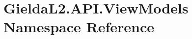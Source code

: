 \hypertarget{namespace_gielda_l2_1_1_a_p_i_1_1_view_models}{}\section{Gielda\+L2.\+A\+P\+I.\+View\+Models Namespace Reference}
\label{namespace_gielda_l2_1_1_a_p_i_1_1_view_models}
